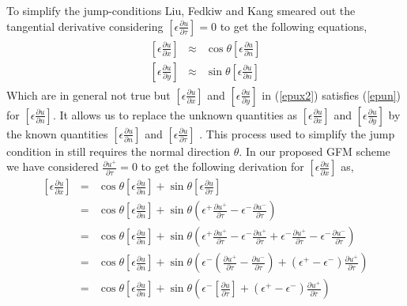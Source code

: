 To simplify the jump-conditions Liu, Fedkiw and Kang \cite{Liu2000}  smeared out the tangential derivative considering $\left[\epsilon \frac{\partial u}{\partial \tau}\right]=0$ to get the following equations, 
\begin{eqnarray}
\begin{aligned}
	\left[\epsilon \frac{\partial u}{\partial x}\right] &\approx& \cos \theta \left[\epsilon \frac{\partial u}{\partial n}\right]\label{epux2}   \\
	\left[\epsilon \frac{\partial u}{\partial y}\right] &\approx& \sin \theta \left[\epsilon \frac{\partial u}{\partial n}\right] \label{epuy2}
\end{aligned}	
\end{eqnarray}
Which are in general not true but $\left[\epsilon \frac{\partial u}{\partial x}\right]$ and $\left[\epsilon \frac{\partial u}{\partial y}\right]$ in (\ref{epux2}) satisfies (\ref{epun}) for $\left[\epsilon \frac{\partial u}{\partial n}\right]$. It allows us to replace the unknown quantities as  $\left[\epsilon \frac{\partial u}{\partial x}\right]$ and $\left[\epsilon \frac{\partial u}{\partial y}\right]$ by the known quantities $\left[\epsilon \frac{\partial u}{\partial n}\right]$ and $\left[\epsilon \frac{\partial u}{\partial \tau}\right]$   . This process used to simplify the jump condition in \cite{Liu2000} still requires the normal direction $\theta$. In our proposed GFM scheme  we have considered $\frac{\partial u^+}{\partial \tau}=0$ to get the following derivation for $ \left[\epsilon \frac{\partial u}{\partial x}\right] $ as, 
\begin{eqnarray*}
\left[\epsilon \frac{\partial u}{\partial x}\right] &=& \cos \theta \left[\epsilon \frac{\partial u}{\partial n}\right] +\sin \theta \left[\epsilon \frac{\partial u}{\partial \tau}\right]\\
&=& \cos \theta \left[\epsilon \frac{\partial u}{\partial n}\right] +\sin \theta \left(\epsilon^+\frac{\partial u^+}{\partial \tau}-\epsilon^-\frac{\partial u^-}{\partial \tau}\right)\\
&=& \cos \theta\left[\epsilon \frac{\partial u}{\partial n}\right]+\sin \theta \left(\epsilon^+\frac{\partial u^+}{\partial \tau}-\epsilon^-\frac{\partial u^+}{\partial \tau}+\epsilon^-\frac{\partial u^+}{\partial \tau}-\epsilon^-\frac{\partial u^-}{\partial \tau}\right)\\
&=&\cos \theta\left[\epsilon \frac{\partial u}{\partial n}\right]+\sin \theta \left(\epsilon^-\left(\frac{\partial u^+}{\partial \tau}-\frac{\partial u^-}{\partial \tau}\right)+(\epsilon^+-\epsilon^-)\frac{\partial u^+}{\partial \tau}\right)\\
&=&\cos \theta\left[\epsilon \frac{\partial u}{\partial n}\right]+\sin \theta \left(\epsilon^-\left[\frac{\partial u}{\partial \tau}\right]+(\epsilon^+-\epsilon^-)\frac{\partial u^+}{\partial \tau}\right)
\end{eqnarray*}
